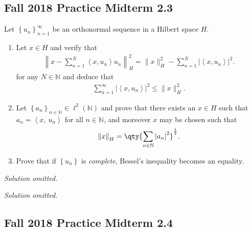 \hypertarget{fall-2018-practice-midterm-2.3}{%
\subsection{Fall 2018 Practice Midterm
2.3}\label{fall-2018-practice-midterm-2.3}}

\label{hilbert_space_exam_question}

Let \(\left\{{u_n}\right\}_{n=1}^\infty\) be an orthonormal sequence in
a Hilbert space \(H\).

\begin{enumerate}
\def\labelenumi{\alph{enumi}.}
\item
  Let \(x\in H\) and verify that
  \begin{align*}
  \left\|x-\sum_{n=1}^{N}\left\langle x, u_{n}\right\rangle u_{n}\right\|_H^{2} =
  \|x\|_H^{2}-\sum_{n=1}^{N}\left|\left\langle x, u_{n}\right\rangle\right|^{2}
  .\end{align*}
  for any \(N\in {\mathbb{N}}\) and deduce that
  \begin{align*}
  \sum_{n=1}^{\infty}\left|\left\langle x, u_{n}\right\rangle\right|^{2} \leq\|x\|_H^{2}
  .\end{align*}
\item
  Let
  \(\left\{{a_n}\right\}_{n\in {\mathbb{N}}} \in \ell^2({\mathbb{N}})\)
  and prove that there exists an \(x\in H\) such that
  \(a_n = {\left\langle {x},~{u_n} \right\rangle}\) for all
  \(n\in {\mathbb{N}}\), and moreover \(x\) may be chosen such that
  \begin{align*}
  {\left\lVert {x} \right\rVert}_H = \qty{ \sum_{n\in {\mathbb{N}}} {\left\lvert {a_n} \right\rvert}^2}^{1\over 2}
  .\end{align*}
\item
  Prove that if \(\left\{{u_n}\right\}\) is \emph{complete}, Bessel's
  inequality becomes an equality.
\end{enumerate}

\emph{Solution omitted.}

\emph{Solution omitted.}

\hypertarget{fall-2018-practice-midterm-2.4}{%
\subsection{Fall 2018 Practice Midterm
2.4}\label{fall-2018-practice-midterm-2.4}}


